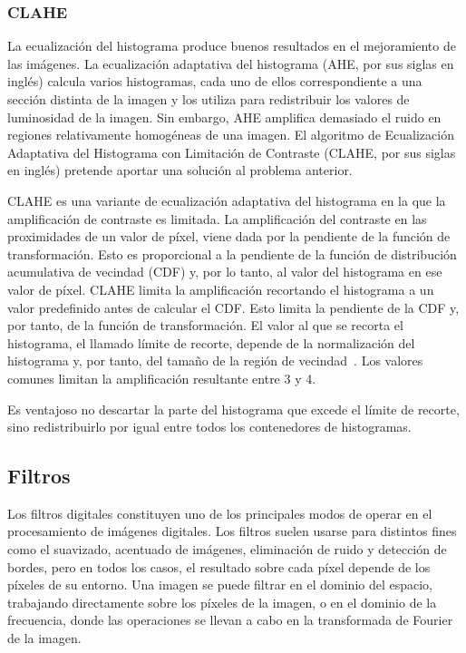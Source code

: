 \subsubsection{CLAHE}

La ecualización del histograma produce buenos resultados en el mejoramiento de las imágenes. La ecualización adaptativa del histograma (AHE, por sus siglas en inglés) calcula varios histogramas, cada uno de ellos correspondiente a una sección distinta de la imagen y los utiliza para redistribuir los valores de luminosidad de la imagen.  Sin embargo, AHE amplifica demasiado el ruido en regiones relativamente homogéneas de una imagen. El algoritmo de Ecualización Adaptativa del Histograma con Limitación de Contraste (CLAHE, por sus siglas en inglés) pretende aportar una solución al problema anterior. 

CLAHE es una variante de ecualización adaptativa del histograma en la que la amplificación de contraste es limitada. La amplificación del contraste en las proximidades de un valor de píxel, viene dada por la pendiente de la función de transformación. Esto es proporcional a la pendiente de la función de distribución acumulativa de vecindad (CDF) y, por lo tanto, al valor del histograma en ese valor de píxel.  CLAHE limita la amplificación recortando el histograma a un valor predefinido antes de calcular el CDF. Esto limita la pendiente de la CDF y, por tanto, de la función de transformación. El valor al que se recorta el histograma, el llamado límite de recorte, depende de la normalización del histograma y, por tanto, del tamaño de la región de vecindad~\cite{pizer1987adaptive}. Los valores comunes limitan la amplificación resultante entre 3 y 4.
 
Es ventajoso no descartar la parte del histograma que excede el límite de recorte, sino redistribuirlo por igual entre todos los contenedores de histogramas.


\subsection{Filtros}

Los filtros digitales constituyen uno de los principales modos de operar en el procesamiento de imágenes digitales. Los filtros suelen usarse para distintos fines como el suavizado, acentuado de imágenes, eliminación de ruido y detección de bordes, pero en todos los casos, el resultado sobre cada píxel depende de los píxeles de su entorno. Una imagen se puede filtrar en el dominio del espacio, trabajando directamente sobre los píxeles de la imagen, o en el dominio de la frecuencia, donde las operaciones se llevan a cabo en la transformada de Fourier de la imagen.

